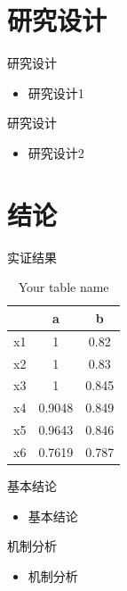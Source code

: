 \documentclass{beamer}
\begin{document}
\section{研究设计}
\begin{frame}{研究设计}
\begin{itemize}
    \item 研究设计1
\end{itemize}
\end{frame}

\begin{frame}{研究设计}
\begin{itemize}
    \item 研究设计2
\end{itemize}
\end{frame}


\section{结论}
\begin{frame}{实证结果}

\begin{table}
\begin{tabular}{c|cc}
 & a & b \\
\hline
x1           & 1                      & 0.82             \\
x2           & 1                      & 0.83             \\
x3           & 1                      & 0.845            \\
x4           & 0.9048                 & 0.849            \\
x5           & 0.9643                 & 0.846            \\
x6           & 0.7619                 & 0.787           
\end{tabular}
\caption{Your table name}
\label{table:1}
\end{table}

\end{frame}

\begin{frame}{基本结论}
\begin{itemize}
    \item 基本结论
\end{itemize}
\end{frame}

\begin{frame}{机制分析}
\begin{itemize}
    \item 机制分析
\end{itemize}
\end{frame}
\end{document}
